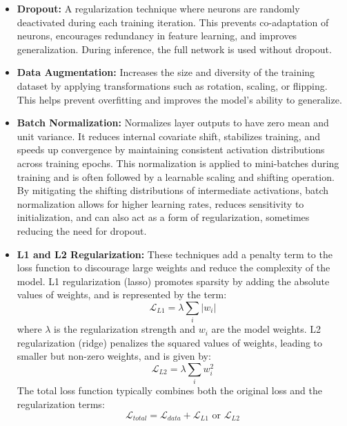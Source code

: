 \begin{itemize}
  \item \textbf{Dropout:} \autocite{10.5555/2627435.2670313} A regularization technique where neurons are randomly deactivated during each training iteration. This prevents co-adaptation of neurons, encourages redundancy in feature learning, and improves generalization. During inference, the full network is used without dropout.

  \item \textbf{Data Augmentation:} \autocite{10.1145/3510413} Increases the size and diversity of the training dataset by applying transformations such as rotation, scaling, or flipping. This helps prevent overfitting and improves the model's ability to generalize.

  \item \textbf{Batch Normalization:} \autocite{NEURIPS2018_36072923} \autocite{10.1145/3510413} Normalizes layer outputs to have zero mean and unit variance. It reduces internal covariate shift, stabilizes training, and speeds up convergence by maintaining consistent activation distributions across training epochs. This normalization is applied to mini-batches during training and is often followed by a learnable scaling and shifting operation. By mitigating the shifting distributions of intermediate activations, batch normalization allows for higher learning rates, reduces sensitivity to initialization, and can also act as a form of regularization, sometimes reducing the need for dropout.

  \item \textbf{L1 and L2 Regularization:} \autocite{kukačka2017regularizationdeeplearningtaxonomy} These techniques add a penalty term to the loss function to discourage large weights and reduce the complexity of the model. L1 regularization (lasso) promotes sparsity by adding the absolute values of weights, and is represented by the term:
    \[
      \mathcal{L}_{L1} = \lambda \sum_{i} |w_i|
    \]
    where \( \lambda \) is the regularization strength and \( w_i \) are the model weights. L2 regularization (ridge) penalizes the squared values of weights, leading to smaller but non-zero weights, and is given by:
    \[
      \mathcal{L}_{L2} = \lambda \sum_{i} w_i^2
    \]
    The total loss function typically combines both the original loss and the regularization terms:
    \[
      \mathcal{L}_{total} = \mathcal{L}_{data} + \mathcal{L}_{L1} \text{ or } \mathcal{L}_{L2}
    \]
\end{itemize}
